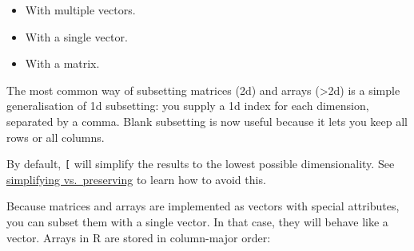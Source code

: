 \begin{itemize}
\itemsep1pt\parskip0pt
\item
  With multiple vectors.
\item
  With a single vector.
\item
  With a matrix.
\end{itemize}

The most common way of subsetting matrices (2d) and arrays
(\textgreater{}2d) is a simple generalisation of 1d subsetting: you
supply a 1d index for each dimension, separated by a comma. Blank
subsetting is now useful because it lets you keep all rows or all
columns.

\begin{Shaded}
\begin{Highlighting}[]
\StringTok{ }\NormalTok{(}\NormalTok{:}\NormalTok{, } \NormalTok{)}
\StringTok{ }\NormalTok{(}\NormalTok{, }\NormalTok{, }\NormalTok{)}
\NormalTok{a[}\NormalTok{:}\NormalTok{, ]}
\NormalTok{a[}\NormalTok{(}\NormalTok{, }\NormalTok{)]}
\NormalTok{a[}\NormalTok{, -}\NormalTok{]}
\end{Highlighting}
\end{Shaded}

By default, \texttt{{[}} will simplify the results to the lowest
possible dimensionality. See \hyperref[simplify-preserve]{simplifying
vs.~preserving} to learn how to avoid this.

Because matrices and arrays are implemented as vectors with special
attributes, you can subset them with a single vector. In that case, they
will behave like a vector. Arrays in R are stored in column-major order:

\begin{Shaded}
\begin{Highlighting}[]
\StringTok{ }\NormalTok{(}\NormalTok{:}\NormalTok{, }\NormalTok{:}\NormalTok{, } \NormalTok{, } \NormalTok{))}
\CommentTok{#>      [,1]  [,2]  [,3]  [,4]  [,5] }
\NormalTok{vals[}\NormalTok{(}\NormalTok{, }\NormalTok{)]}
\end{Highlighting}
\end{Shaded}

